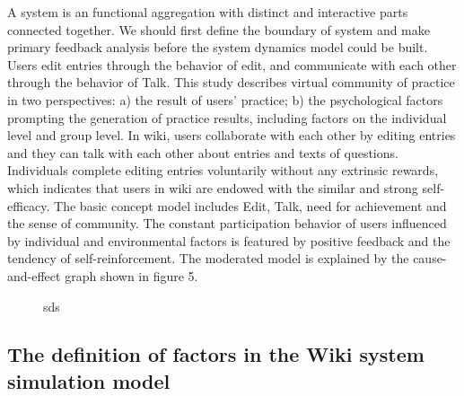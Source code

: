 \documentclass{elsarticle}
\begin{document}
A system is an functional aggregation with distinct and interactive parts connected together. We should first define the boundary of system and make primary feedback analysis before the system dynamics model could be built. Users edit entries through the behavior of edit, and communicate with each other through the behavior of Talk. This study describes virtual community of practice in two perspectives: a) the result of users’ practice; b) the psychological factors prompting the generation of practice results, including factors on the individual level and group level. In wiki, users collaborate with each other by editing entries and they can talk with each other about entries and texts of questions. Individuals complete editing entries voluntarily without any extrinsic rewards, which indicates that users in wiki are endowed with the similar and strong self-efficacy. The basic concept model includes Edit, Talk, need for achievement and the sense of community. The constant participation behavior of users influenced by individual and environmental factors is featured by positive feedback and the tendency of self-reinforcement. The moderated model is explained by the cause-and-effect graph shown in figure 5. 

\begin{figure}[htpb]
  \centering
  \caption{sds}
\end{figure}
\subsection{The definition of factors in the Wiki system simulation model
}
\label{sec:defin-fact-wiki}
\end{document}
